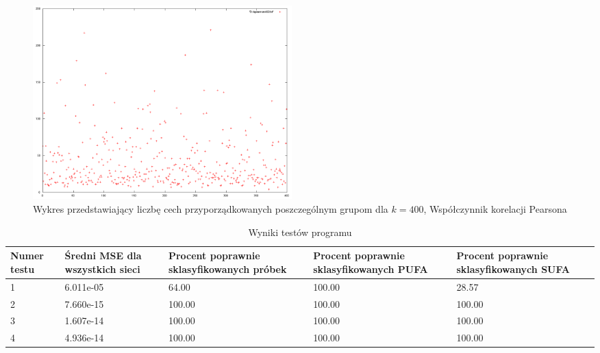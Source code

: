 \documentclass{classrep}
\begin{document}
\begin{figure}
  \centering
  \includegraphics[width=10cm]{img/spearman400.png}
  \caption{Wykres przedstawiający liczbę cech przyporządkowanych poszczególnym
grupom dla $k=400$, Współczynnik korelacji Pearsona}
  \label{spearman.400}
\end{figure}

\begin{table}
\caption{Wyniki testów programu}
\label{testTab1}
\begin{tabular}{|p{1.5cm}|p{2.5cm}|p{2.5cm}|p{2.5cm}|p{2.5cm}|}
 \textbf{Numer testu} & \textbf{Średni MSE dla wszystkich sieci} & \textbf{Procent poprawnie sklasyfikowanych próbek} & \textbf{Procent poprawnie sklasyfikowanych PUFA} & \textbf{Procent poprawnie sklasyfikowanych SUFA} \\ \hline
 1 & 6.011e-05 & 64.00  & 100.00 & 28.57	\\ \hline
 2 & 7.660e-15 & 100.00 & 100.00 & 100.00	\\ \hline
 3 & 1.607e-14 & 100.00 & 100.00 & 100.00 	\\ \hline
 4 & 4.936e-14 & 100.00 & 100.00 & 100.00 	\\ \hline
\end{tabular}
\end{table}
\end{document}
